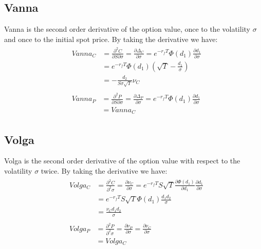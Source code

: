 \subsection{Vanna}
Vanna is the second order derivative of the option value, once to the volatility $\sigma$ and once to the initial spot price. \newline
By taking the derivative we have:
\begin{align}
&\begin{aligned}
Vanna_C &= \frac{\partial^2 C}{\partial S \partial \sigma} = \frac{\partial \Delta_C}{\partial \sigma} = e^{-r_fT}\varPhi(d_1)\frac{\partial d_1}{\partial \sigma} \\
&= e^{-r_fT}\varPhi(d_1)\left( \sqrt{T} - \frac{d_1}{\sigma}\right) \\
&= -\frac{d_2}{S\sigma \sqrt{T}}\nu_C
\end{aligned} \\
&\begin{aligned}
Vanna_P &= \frac{\partial^2 P}{\partial S \partial \sigma} = \frac{\partial \Delta_P}{\partial \sigma} = e^{-r_fT}\varPhi(d_1)\frac{\partial d_1}{\partial \sigma} \\
&= Vanna_C
\end{aligned}
\end{align}

\subsection{Volga}
Volga is the second order derivative of the option value with respect to the volatility $\sigma$ twice. \newline
By taking the derivative we have:
\begin{align}
&\begin{aligned}
Volga_C &= \frac{\partial^2 C}{\partial^2 \sigma} = \frac{\partial \nu_C}{\partial \sigma} = e^{-r_fT}S\sqrt{T}\frac{\partial \varPhi(d_1)}{\partial d_1}\frac{\partial d_1}{\partial \sigma} \\
&= e^{-r_fT}S\sqrt{T}\varPhi(d_1)\frac{d_1d_2}{\sigma} \\
&= \frac{\nu_C d_1d_2}{\sigma}
\end{aligned} \\
&\begin{aligned}
Volga_P &= \frac{\partial^2 P}{\partial^2 \sigma} = \frac{\partial \nu_P}{\partial \sigma} = \frac{\partial \nu_C}{\partial \sigma}  \\
&= Volga_C
\end{aligned}
\end{align}


